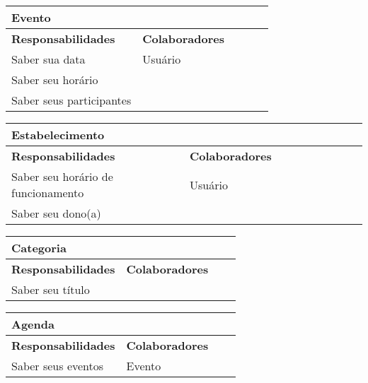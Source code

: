 \documentclass{article}
\begin{document}
    
    \begin{center}
   	 \begin{tabular}{|p{0.5\linewidth}|p{0.5\linewidth}|}
\hline
 	\multicolumn{2}{|p{\textwidth}|}{
{\large \textbf{Evento}}
}  \\
\hline
\textbf{Responsabilidades} & \textbf{Colaboradores} \\ 
\hline
  	Saber sua data & Usuário \\
  	\hline
  	Saber seu horário &  \\
  	\hline
  	Saber seus participantes & \\
  	\hline
   	\end{tabular} 
    \end{center}
    
    
    \begin{center}
   	 \begin{tabular}{|p{0.5\linewidth}|p{0.5\linewidth}|}
\hline
 	\multicolumn{2}{|p{\textwidth}|}{
{\large \textbf{Estabelecimento}}
}  \\
\hline
\textbf{Responsabilidades} & \textbf{Colaboradores} \\ 
\hline
  	Saber seu horário de funcionamento & Usuário \\
  	\hline
  	Saber seu dono(a) &  \\
  	\hline
   	\end{tabular} 
    \end{center}
    
    
    \begin{center}
   	 \begin{tabular}{|p{0.5\linewidth}|p{0.5\linewidth}|}
\hline
 	\multicolumn{2}{|p{\textwidth}|}{
{\large \textbf{Categoria}}
}  \\
\hline
\textbf{Responsabilidades} & \textbf{Colaboradores} \\ 
\hline
  	Saber seu título &  \\
  	\hline
   	\end{tabular} 
    \end{center}
    
    
    \begin{center}
   	 \begin{tabular}{|p{0.5\linewidth}|p{0.5\linewidth}|}
\hline
 	\multicolumn{2}{|p{\textwidth}|}{
{\large \textbf{Agenda}}
}  \\
\hline
\textbf{Responsabilidades} & \textbf{Colaboradores} \\ 
\hline
  	Saber seus eventos & Evento \\
  	\hline
   	\end{tabular} 
    \end{center}
    
\end{document}
